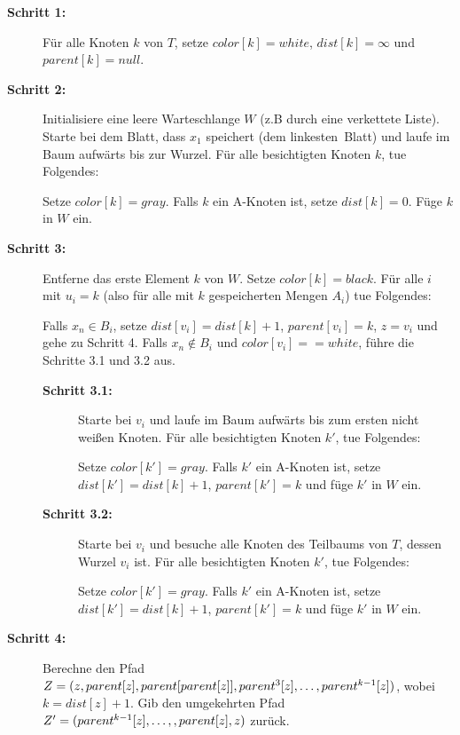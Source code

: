     \begin{description}
    	\item[\textbf{Schritt 1:}] Für alle Knoten $k$ von $T$, setze $color[k] = white$, $dist[k] = \infty$ und $parent[k] = null$.
    	
    	\item[\textbf{Schritt 2:}] Initialisiere eine leere Warteschlange $W$ (z.B durch eine verkettete Liste).
    	Starte bei dem Blatt, dass $x_1$ speichert (dem \glqq linkesten\grqq\ Blatt) und laufe im Baum aufwärts bis zur Wurzel. 
    	Für alle besichtigten Knoten $k$, tue Folgendes: 
    	
		    Setze $color[k] = gray$.
    		Falls $k$ ein A-Knoten ist, setze $dist[k] = 0$.
    		Füge $k$ in $W$ ein.
    		
    	\item[\textbf{Schritt 3:}] Entferne das erste Element $k$ von $W$. Setze $color[k] = black$.
    	Für alle $i$ mit $u_i = k$ (also für alle mit $k$ gespeicherten Mengen $A_i$) tue Folgendes:
    	
    	Falls $x_n \in B_i$, setze $dist[v_i] = dist[k] + 1$, $parent[v_i] = k$, $z = v_i$ und gehe zu Schritt 4.\n
    	Falls $x_n \notin B_i$ und $color[v_i] == white$, führe die Schritte 3.1 und 3.2 aus.
    	\begin{description}
    		\item[\textbf{Schritt 3.1:}] Starte bei $v_i$ und laufe im Baum aufwärts bis zum ersten nicht weißen Knoten. Für alle besichtigten Knoten $k'$, tue Folgendes:
    		
    		Setze $color[k'] = gray$. Falls $k'$ ein A-Knoten ist, setze $dist[k'] = dist[k]+1$, $parent[k'] = k$ und füge $k'$ in $W$ ein.
    		
    		\item[\textbf{Schritt 3.2:}] Starte bei $v_i$ und besuche alle Knoten des Teilbaums von $T$, dessen Wurzel $v_i$ ist. Für alle besichtigten Knoten $k'$, tue Folgendes:
    		
    		Setze $color[k'] = gray$. Falls $k'$ ein A-Knoten ist, setze $dist[k'] = dist[k] + 1$, $parent[k']	= k$ und füge $k'$ in $W$ ein.
    	\end{description}
    	
    	\item[\textbf{Schritt 4:}] Berechne den Pfad $Z = (z, parent[z], parent[parent[z]], parent^3[z],  \mathellipsis, parent^{k-1}[z])$, wobei $k = dist[z] + 1$. Gib den umgekehrten Pfad $Z' = (parent^{k-1}[z], \mathellipsis,, parent[z], z)$ zurück.
    \end{description}
    
